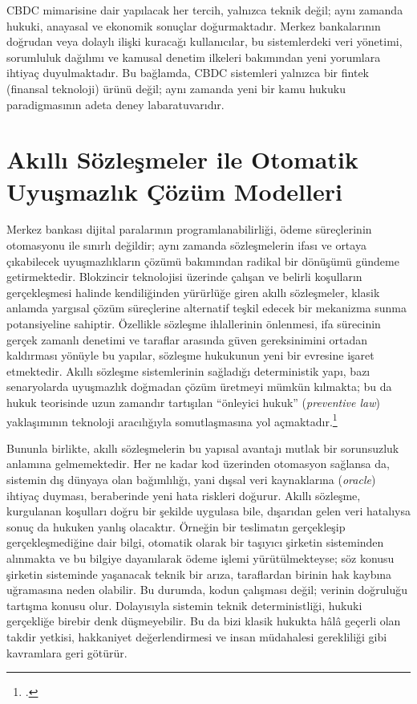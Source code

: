 \documentclass[a4paper,12pt]{article}
\begin{document}
CBDC mimarisine dair yapılacak her tercih, yalnızca teknik değil; aynı zamanda hukuki, anayasal ve ekonomik sonuçlar doğurmaktadır. Merkez bankalarının doğrudan veya dolaylı ilişki kuracağı kullanıcılar, bu sistemlerdeki veri yönetimi, sorumluluk dağılımı ve kamusal denetim ilkeleri bakımından yeni yorumlara ihtiyaç duyulmaktadır. Bu bağlamda, CBDC sistemleri yalnızca bir fintek (finansal teknoloji) ürünü değil; aynı zamanda yeni bir kamu hukuku paradigmasının adeta deney labaratuvarıdır.


\section{Akıllı Sözleşmeler ile Otomatik Uyuşmazlık Çözüm Modelleri}

Merkez bankası dijital paralarının programlanabilirliği, ödeme süreçlerinin otomasyonu ile sınırlı değildir; aynı zamanda sözleşmelerin ifası ve ortaya çıkabilecek uyuşmazlıkların çözümü bakımından radikal bir dönüşümü gündeme getirmektedir. Blokzincir teknolojisi üzerinde çalışan ve belirli koşulların gerçekleşmesi halinde kendiliğinden yürürlüğe giren akıllı sözleşmeler, klasik anlamda yargısal çözüm süreçlerine alternatif teşkil edecek bir mekanizma sunma potansiyeline sahiptir. Özellikle sözleşme ihlallerinin önlenmesi, ifa sürecinin gerçek zamanlı denetimi ve taraflar arasında güven gereksinimini ortadan kaldırması yönüyle bu yapılar, sözleşme hukukunun yeni bir evresine işaret etmektedir. Akıllı sözleşme sistemlerinin sağladığı deterministik yapı, bazı senaryolarda uyuşmazlık doğmadan çözüm üretmeyi mümkün kılmakta; bu da hukuk teorisinde uzun zamandır tartışılan “önleyici hukuk” (\textit{preventive law}) yaklaşımının teknoloji aracılığıyla somutlaşmasına yol açmaktadır.\footcite{lessig1999code}

Bununla birlikte, akıllı sözleşmelerin bu yapısal avantajı mutlak bir sorunsuzluk anlamına gelmemektedir. Her ne kadar kod üzerinden otomasyon sağlansa da, sistemin dış dünyaya olan bağımlılığı, yani dışsal veri kaynaklarına (\textit{oracle}) ihtiyaç duyması, beraberinde yeni hata riskleri doğurur. Akıllı sözleşme, kurgulanan koşulları doğru bir şekilde uygulasa bile, dışarıdan gelen veri hatalıysa sonuç da hukuken yanlış olacaktır. Örneğin bir teslimatın gerçekleşip gerçekleşmediğine dair bilgi, otomatik olarak bir taşıyıcı şirketin sisteminden alınmakta ve bu bilgiye dayanılarak ödeme işlemi yürütülmekteyse; söz konusu şirketin sisteminde yaşanacak teknik bir arıza, taraflardan birinin hak kaybına uğramasına neden olabilir. Bu durumda, kodun çalışması değil; verinin doğruluğu tartışma konusu olur. Dolayısıyla sistemin teknik deterministliği, hukuki gerçekliğe birebir denk düşmeyebilir. Bu da bizi klasik hukukta hâlâ geçerli olan takdir yetkisi, hakkaniyet değerlendirmesi ve insan müdahalesi gerekliliği gibi kavramlara geri götürür.
\end{document}
